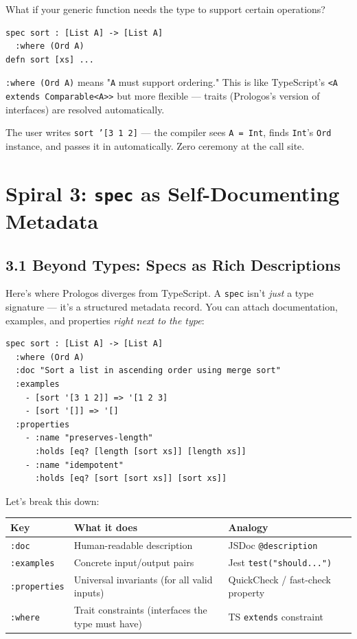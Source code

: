 \documentclass[11pt]{article}
\begin{document}
What if your generic function needs the type to support certain operations?

\begin{verbatim}
spec sort : [List A] -> [List A]
  :where (Ord A)
defn sort [xs] ...
\end{verbatim}

\texttt{:where (Ord A)} means "\texttt{A} must support ordering." This is like
TypeScript's \texttt{<A extends Comparable<A>{}>{}} but more flexible --- traits
(Prologos's version of interfaces) are resolved automatically.

The user writes \texttt{sort '[3 1 2]} --- the compiler sees \texttt{A = Int},
finds \texttt{Int}'s \texttt{Ord} instance, and passes it in automatically. Zero
ceremony at the call site.
\section{Spiral 3: \texttt{spec} as Self-Documenting Metadata}
\label{sec:orge4889e0}

\subsection{3.1 Beyond Types: Specs as Rich Descriptions}
\label{sec:org93b4305}

Here's where Prologos diverges from TypeScript. A \texttt{spec} isn't \emph{just} a
type signature --- it's a structured metadata record. You can attach
documentation, examples, and properties \emph{right next to the type}:

\begin{verbatim}
spec sort : [List A] -> [List A]
  :where (Ord A)
  :doc "Sort a list in ascending order using merge sort"
  :examples
    - [sort '[3 1 2]] => '[1 2 3]
    - [sort '[]] => '[]
  :properties
    - :name "preserves-length"
      :holds [eq? [length [sort xs]] [length xs]]
    - :name "idempotent"
      :holds [eq? [sort [sort xs]] [sort xs]]
\end{verbatim}

Let's break this down:

\begin{center}
\begin{tabular}{lll}
Key & What it does & Analogy\\
\hline
\texttt{:doc} & Human-readable description & JSDoc \texttt{@description}\\
\texttt{:examples} & Concrete input/output pairs & Jest \texttt{test("should...")}\\
\texttt{:properties} & Universal invariants (for all valid inputs) & QuickCheck / fast-check property\\
\texttt{:where} & Trait constraints (interfaces the type must have) & TS \texttt{extends} constraint\\
\end{tabular}
\end{center}
\end{document}

